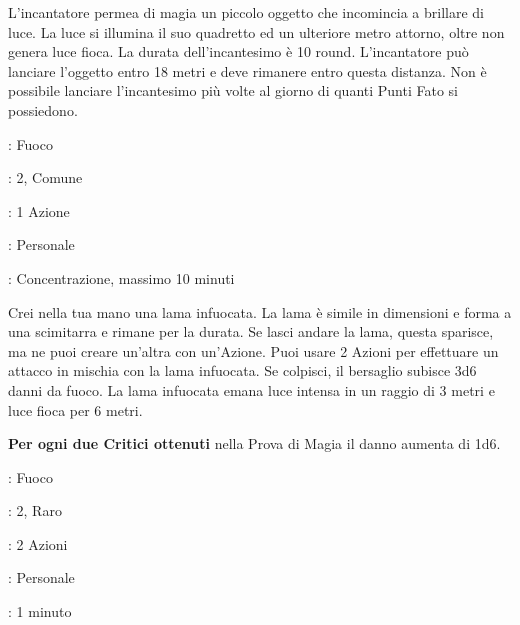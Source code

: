 \begin{multicols}{2}
L'incantatore permea di magia un piccolo oggetto che incomincia a brillare di luce. La luce si illumina il suo quadretto ed un ulteriore metro attorno, oltre non genera luce fioca. La durata dell'incantesimo è 10 round. L'incantatore può lanciare l'oggetto entro 18 metri e deve rimanere entro questa distanza. Non è possibile lanciare l'incantesimo più volte al giorno di quanti Punti Fato si possiedono.

\noindent\colorbox{OBSSgold!10}{
\begin{minipage}{0.95\linewidth}
\begin{description}[noitemsep, topsep=0pt, parsep=0pt, partopsep=0pt, leftmargin=0cm, labelwidth=1.3cm]
	\item[\textbf{Lista}]: Fuoco
	\item[\textbf{Livello}]: 2, Comune
	\item[\textbf{Lancio}]: 1 Azione
	\item[\textbf{Gittata}]: Personale
	\item[\textbf{Durata}]: Concentrazione, massimo 10 minuti
\end{description}
\end{minipage}}\smallskip

Crei nella tua mano una lama infuocata. La lama è simile in dimensioni e forma a una scimitarra e rimane per la durata. Se lasci andare la lama, questa sparisce, ma ne puoi creare un'altra con un'Azione. Puoi usare 2 Azioni per effettuare un attacco in mischia con la lama infuocata. Se colpisci, il bersaglio subisce 3d6 danni da fuoco. La lama infuocata emana luce intensa in un raggio di 3 metri e luce fioca per 6 metri.

\textbf{Per ogni due Critici ottenuti} nella Prova di Magia il danno aumenta di 1d6.

\noindent\colorbox{OBSSgold!10}{
\begin{minipage}{0.95\linewidth}
\begin{description}[noitemsep, topsep=0pt, parsep=0pt, partopsep=0pt, leftmargin=0cm, labelwidth=1.3cm]
	\item[\textbf{Lista}]: Fuoco
	\item[\textbf{Livello}]: 2, Raro
	\item[\textbf{Lancio}]: 2 Azioni
	\item[\textbf{Gittata}]: Personale
	\item[\textbf{Durata}]: 1 minuto
\end{description}
\end{minipage}}\smallskip


\end{multicols}
